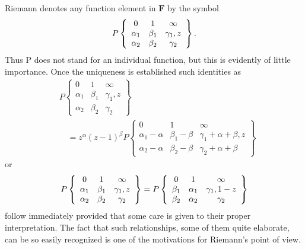Riemann denotes any function element in $\mathbf{F}$ by the symbol
\begin{equation*}
P \left\{ \begin{array}{c c c} 0 & 1 & \infty \\ \alpha_ {1} & \beta_ {1} & \gamma_ {1}, z \\ \alpha_ {2} & \beta_ {2} & \gamma_ {2} \end{array} \right\}.
\end{equation*}
Thus P does not stand for an individual function, but this is evidently of little importance. Once the uniqueness is established such identities as
\begin{equation*}
\begin{aligned}
&P\left\{\begin{array}{ccc}
0&1&\infty\\\alpha_1&\beta_1&\gamma_1,z\\\alpha_2&\beta_2&\gamma_2
\end{array}\right\}\\
&\quad=z^\alpha(z-1)^\beta P\left\{\begin{array}{ccc}
0&1&\infty\\\alpha_1-\alpha&\beta_1-\beta&\gamma_1+\alpha+\beta,z\\
\alpha_2-\alpha&\beta_2-\beta&\gamma_2+\alpha+\beta
\end{array}\right\}
\end{aligned}
\end{equation*}
or
\begin{equation*}
P \left\{ \begin{array}{c c c} 0 & 1 & \infty \\ \alpha_ {1} & \beta_ {1} & \gamma_ {1}, z \\ \alpha_ {2} & \beta_ {2} & \gamma_ {2} \end{array} \right\} = P \left\{ \begin{array}{c c c} 0 & 1 & \infty \\ \beta_ {1} & \alpha_ {1} & \gamma_ {1}, 1 - z \\ \beta_ {2} & \alpha_ {2} & \gamma_ {2} \end{array} \right\}
\end{equation*}
follow immediately provided that some care is given to their proper interpretation. The fact that such relationships, some of them quite elaborate, can be so easily recognized is one of the motivations for Riemann's point of view.

